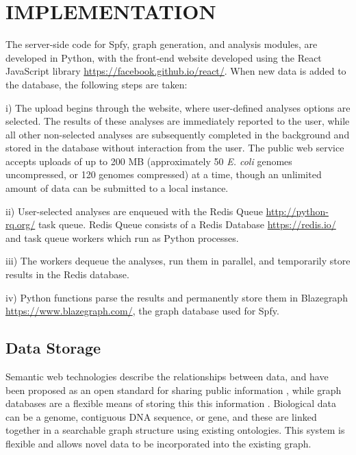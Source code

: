 \documentclass{article}
\begin{document}
\section{IMPLEMENTATION}
The server-side code for Spfy, graph generation, and analysis modules, are developed in Python, with the front-end website developed using the React JavaScript library \url{https://facebook.github.io/react/}. When new data is added to the database, the following steps are taken:

i) The upload begins through the website, where user-defined analyses options are selected. The results of these analyses are immediately reported to the user, while all other non-selected analyses are subsequently completed in the background and stored in the database without interaction from the user. The public web service accepts uploads of up to 200 MB (approximately 50 \textit {E. coli} genomes uncompressed, or 120 genomes compressed) at a time, though an unlimited amount of data can be submitted to a local instance.

ii) User-selected analyses are enqueued with the Redis Queue \url{http://python-rq.org/} task queue. Redis Queue consists of a Redis Database \url{https://redis.io/} and task queue workers which run as Python processes.

iii) The workers dequeue the analyses, run them in parallel, and temporarily store results in the Redis database.

iv) Python functions parse the results and permanently store them in Blazegraph \url{https://www.blazegraph.com/}, the graph database used for Spfy.

\subsection{Data Storage}
Semantic web technologies describe the relationships between data, and have been proposed as an open standard for sharing public information \cite{berners2001semantic}, while graph databases are a flexible means of storing this this information \cite{horrocks2005semantic}. Biological data can be a genome, contiguous DNA sequence, or gene, and these are linked together in a searchable graph structure using existing ontologies. This system is flexible and allows novel data to be incorporated into the existing graph.
\end{document}
